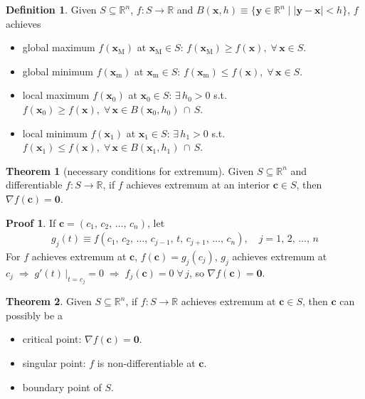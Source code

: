 \documentclass[10pt]{extarticle}
\newcommand{\ds}{\displaystyle}
\newcommand{\ie}{\;\Longrightarrow\;}
\theoremstyle{definition}
\newtheorem*{dfn}{Definition}
\newtheorem*{thm}{Theorem}
\newtheorem*{prf}{Proof}
\newcommand{\vc}{\mathbf{c}}
\newcommand{\vx}{\mathbf{x}}
\newcommand{\vy}{\mathbf{y}}
\newcommand{\vZero}{\mathbf{0}}
\begin{document}
\begin{dfn}
  Given $\ds S\subseteq\mathbb{R}^n$, $\ds f:S\to\mathbb{R}$ and $\ds B(\vx, h)\equiv\{\vy\in\mathbb{R}^n\;|\;|\vy - \vx| < h\}$, $f$ achieves 
  \begin{itemize}%
    \item global maximum $\ds f(\vx_\text{M})$ at $\ds\vx_\text{M}\in S$: $\ds f(\vx_\text{M})\geqslant f(\vx),\;\forall\,\vx\in S$. 
    \item global minimum $\ds f(\vx_\text{m})$ at $\ds \vx_\text{m}\in S$: $\ds f(\vx_\text{m})\leqslant f(\vx),\;\forall\,\vx\in S$. 
    \item local maximum $\ds f(\vx_0)$ at $\ds\vx_0\in S$: $\ds\exists\,h_0 > 0$ s.t. $\ds f(\vx_0)\geqslant f(\vx),\;\forall\,\vx\in B(\vx_0, h_0)\,\cap\,S$. 
    \item local minimum $\ds f(\vx_1)$ at $\ds\vx_1\in S$: $\ds\exists\,h_1 > 0$ s.t. $\ds f(\vx_1)\leqslant f(\vx),\;\forall\,\vx\in B(\vx_1, h_1)\,\cap\,S$. 
  \end{itemize}
\end{dfn}

\newpage

\begin{thm}[necessary conditions for extremum]
  Given $\ds S\subseteq\mathbb{R}^n$ and differentiable $\ds f:S\to\mathbb{R}$, if $f$ achieves extremum at an interior $\vc\in S$, then $\ds\nabla f(\vc) = \vZero$. 
\end{thm}

\begin{prf}
  If $\ds\vc = (c_1,\,c_2,\,\ldots,\,c_n)$, let 
  \begin{align*}
    g_j(t)\equiv f(c_1,\,c_2,\,\ldots,\,c_{j - 1},\,t,\,c_{j + 1},\,\ldots,\,c_n), \quad j = 1,\,2,\,\ldots,\,n 
  \end{align*}
  For $f$ achieves extremum at $\vc$, $f(\vc) = g_j(c_j)$, $g_j$ achieves extremum at $c_j\ie g'(t)\,\big|_{t = c_j} = 0 \ie f_j(\vc) = 0\;\forall\,j$, so $\ds\nabla f(\vc) = \vZero$.  
\end{prf}

\begin{thm}
  Given $\ds S\subseteq\mathbb{R}^n$, if $f:S\to\mathbb{R}$ achieves extremum at $\vc\in S$, then $\vc$ can possibly be a
    \begin{itemize}%
      \item critical point: $\ds \nabla f(\vc) = \vZero$. 
      \item singular point: $f$ is non-differentiable at $\vc$.  
      \item boundary point of $S$. 
    \end{itemize}
\end{thm}
\end{document}
